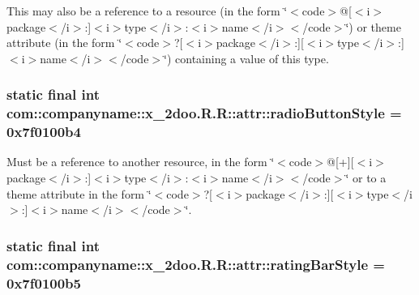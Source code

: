 This may also be a reference to a resource (in the form \char`\"{}$<$code$>$@\mbox{[}$<$i$>$package$<$/i$>$:\mbox{]}$<$i$>$type$<$/i$>$:$<$i$>$name$<$/i$>$$<$/code$>$\char`\"{}) or theme attribute (in the form \char`\"{}$<$code$>$?\mbox{[}$<$i$>$package$<$/i$>$:\mbox{]}\mbox{[}$<$i$>$type$<$/i$>$:\mbox{]}$<$i$>$name$<$/i$>$$<$/code$>$\char`\"{}) containing a value of this type. \hypertarget{classcom_1_1companyname_1_1x__2doo_1_1_r_1_1attr_fa8d45cd978def1e56fbbb4b1abb5333}{
\subsubsection[{radioButtonStyle}]{\setlength{\rightskip}{0pt plus 5cm}static final int com::companyname::x\_\-2doo.R.R::attr::radioButtonStyle = 0x7f0100b4}}
\label{classcom_1_1companyname_1_1x__2doo_1_1_r_1_1attr_fa8d45cd978def1e56fbbb4b1abb5333}


Must be a reference to another resource, in the form \char`\"{}$<$code$>$@\mbox{[}+\mbox{]}\mbox{[}$<$i$>$package$<$/i$>$:\mbox{]}$<$i$>$type$<$/i$>$:$<$i$>$name$<$/i$>$$<$/code$>$\char`\"{} or to a theme attribute in the form \char`\"{}$<$code$>$?\mbox{[}$<$i$>$package$<$/i$>$:\mbox{]}\mbox{[}$<$i$>$type$<$/i$>$:\mbox{]}$<$i$>$name$<$/i$>$$<$/code$>$\char`\"{}. \hypertarget{classcom_1_1companyname_1_1x__2doo_1_1_r_1_1attr_a5f1e9d6f820079a4e0fb703e312ee82}{
\subsubsection[{ratingBarStyle}]{\setlength{\rightskip}{0pt plus 5cm}static final int com::companyname::x\_\-2doo.R.R::attr::ratingBarStyle = 0x7f0100b5}}
\label{classcom_1_1companyname_1_1x__2doo_1_1_r_1_1attr_a5f1e9d6f820079a4e0fb703e312ee82}


